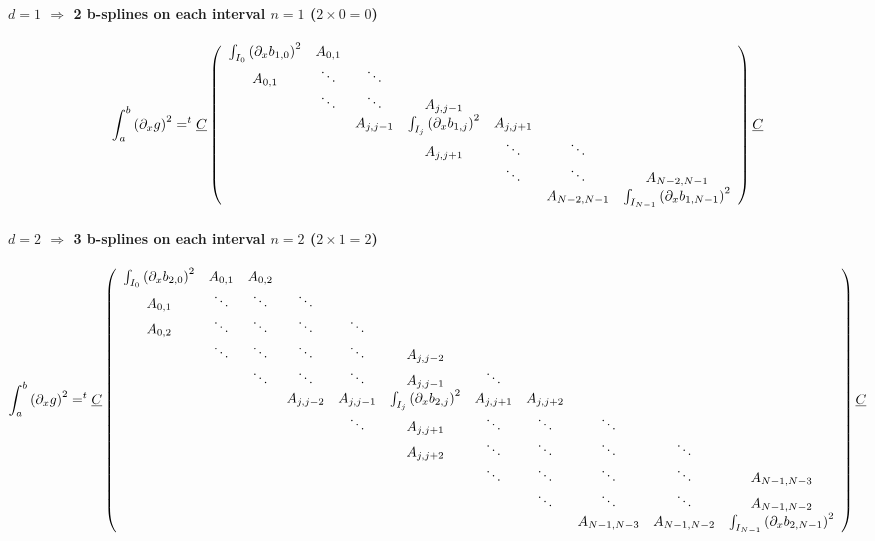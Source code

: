 \documentclass[paper=a4, fontsize=11pt]{scrartcl}
\numberwithin{equation}{section}		%
\numberwithin{figure}{section}			%
\numberwithin{table}{section}				%
\begin{document}
\begin{landscape}
\paragraph{\textbf{$d=1$ $\Rightarrow$ 2 b-splines on each interval $n=1$ ($2\times0=0$)}}
$$
\int_{a}^{b} \left(\partial_x g\right)^2 = ^t\underline{C} \left(\begin{array}{ccccccc}
\int_{I_0}\left(\partial_xb_{1,0}\right)^2&A_{0,1}&&&&&\\ A_{0,1}&\ddots&\ddots&&&&\\
&\ddots&\ddots&A_{j,j-1}&&&\\ &&A_{j,j-1}&\int_{I_j}\left(\partial_xb_{1,j}\right)^2&A_{j,j+1}&&\\ &&&A_{j,j+1}&\ddots&\ddots&\\
&&&&\ddots&\ddots&A_{N-2,N-1}\\ &&&&&A_{N-2,N-1}&\int_{I_{N-1}}\left(\partial_xb_{1,N-1}\right)^2
\end{array}\right) \underline{C}\\
$$

\paragraph{\textbf{$d=2$ $\Rightarrow$ 3 b-splines on each interval $n=2$ ($2\times1=2$)}}
$$
\int_{a}^{b} \left(\partial_xg\right)^2 = ^t\underline{C} \left(\begin{array}{ccccccccccc}
\int_{I_0}\left(\partial_xb_{2,0}\right)^2&A_{0,1}&A_{0,2}&&&&&&&&\\ A_{0,1}&\ddots&\ddots&\ddots&&&&&&&\\ A_{0,2}&\ddots&\ddots&\ddots&\ddots&&&&&&\\
&\ddots&\ddots&\ddots&\ddots&A_{j,j-2}&&&&&\\ &&\ddots&\ddots&\ddots&A_{j,j-1}&\ddots&&&&\\
&&&A_{j,j-2}&A_{j,j-1}&\int_{I_j}\left(\partial_xb_{2,j}\right)^2&A_{j,j+1}&A_{j,j+2}&&&\\
&&&&\ddots&A_{j,j+1}&\ddots&\ddots&\ddots&&\\ &&&&&A_{j,j+2}&\ddots&\ddots&\ddots&\ddots&\\
&&&&&&\ddots&\ddots&\ddots&\ddots&A_{N-1,N-3}\\ &&&&&&&\ddots&\ddots&\ddots&A_{N-1,N-2}\\ &&&&&&&&A_{N-1,N-3}&A_{N-1,N-2}&\int_{I_{N-1}}\left(\partial_xb_{2,N-1}\right)^2
\end{array}\right) \underline{C}\\
$$


\end{landscape}
\end{document}
